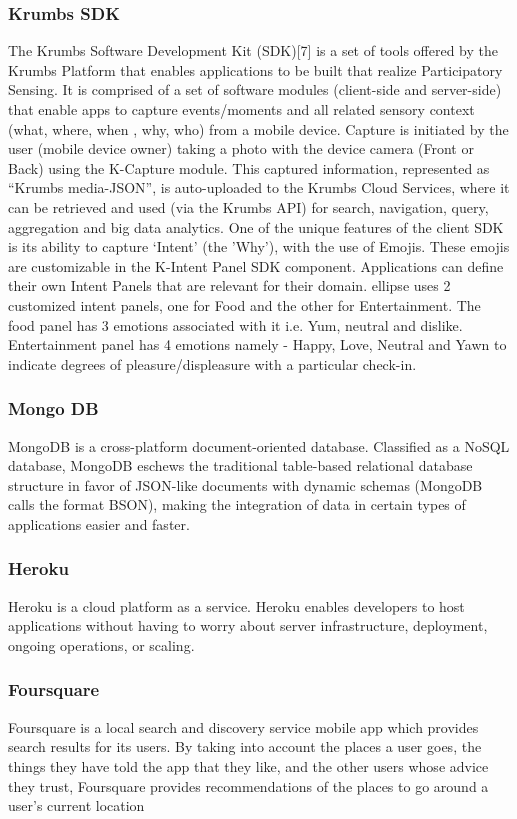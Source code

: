 \documentclass[12pt,letterpaper]{article}
\begin{document}
\subsubsection{Krumbs SDK}
The Krumbs Software Development Kit (SDK)[7] is a set of tools offered by the Krumbs Platform that enables applications to be built that realize Participatory Sensing.  It is comprised of a set of software modules (client-side and server-side) that enable apps to capture events/moments and all related sensory context (what, where, when , why, who) from a mobile device.  Capture is initiated by the user (mobile device owner)  taking a photo with the device camera (Front or Back) using the K-Capture module. This captured information, represented as \enquote{Krumbs media-JSON},  is auto-uploaded to the Krumbs Cloud Services, where it can be retrieved and used (via the Krumbs API) for search, navigation, query, aggregation and big data analytics. One of the unique features of the client SDK is its ability to capture ‘Intent’ (the 'Why'), with the use of Emojis. These emojis are customizable in the K-Intent Panel SDK component. Applications can define their own Intent Panels that are relevant for their domain. ellipse uses 2 customized intent panels, one for Food and the other for Entertainment. The food panel has 3 emotions associated with it i.e. Yum, neutral and dislike. Entertainment panel has 4 emotions namely - Happy, Love, Neutral and Yawn to indicate degrees of pleasure/displeasure with a particular check-in.

\subsubsection{Mongo DB}
MongoDB is a cross-platform document-oriented database. Classified as a NoSQL database, MongoDB eschews the traditional table-based relational database structure in favor of JSON-like documents with dynamic schemas (MongoDB calls the format BSON), making the integration of data in certain types of applications easier and faster.

\subsubsection{Heroku}
Heroku is a cloud platform as a service. Heroku enables developers to host applications without having to worry about server infrastructure, deployment, ongoing operations, or scaling. 

\subsubsection{Foursquare}
Foursquare is a local search and discovery service mobile app which provides search results for its users. By taking into account the places a user goes, the things they have told the app that they like, and the other users whose advice they trust, Foursquare provides recommendations of the places to go around a user's current location \cite{fsapi}
\end{document}
